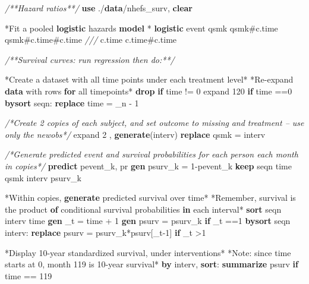 \documentclass[
  10pt,
]{book}
\newenvironment{Shaded}{\begin{snugshade}}{\end{snugshade}}
\newcommand{\BaseNTok}[1]{\textcolor[rgb]{0.00,0.00,0.81}{#1}}
\newcommand{\CommentTok}[1]{\textcolor[rgb]{0.56,0.35,0.01}{\textit{#1}}}
\newcommand{\DataTypeTok}[1]{\textcolor[rgb]{0.13,0.29,0.53}{#1}}
\newcommand{\DecValTok}[1]{\textcolor[rgb]{0.00,0.00,0.81}{#1}}
\newcommand{\FunctionTok}[1]{\textcolor[rgb]{0.00,0.00,0.00}{#1}}
\newcommand{\KeywordTok}[1]{\textcolor[rgb]{0.13,0.29,0.53}{\textbf{#1}}}
\newcommand{\NormalTok}[1]{#1}
\newcommand{\OtherTok}[1]{\textcolor[rgb]{0.56,0.35,0.01}{#1}}
\begin{document}
\begin{Shaded}
\begin{Highlighting}[]
\CommentTok{/**Hazard ratios**/}
\KeywordTok{use}\NormalTok{ ./}\KeywordTok{data}\NormalTok{/nhefs_surv, }\KeywordTok{clear}

\NormalTok{*Fit a pooled }\KeywordTok{logistic}\NormalTok{ hazards }\KeywordTok{model}\NormalTok{ *}
\KeywordTok{logistic}\NormalTok{ event qsmk qsmk#c.time qsmk#c.time#c.time }\CommentTok{///}
\NormalTok{  c.time c.time#c.time }

\CommentTok{/**Survival curves: run regression then do:**/}

\NormalTok{*Create a dataset with }\OtherTok{all}\NormalTok{ time points under each treatment }\DecValTok{level}\NormalTok{*}
\NormalTok{*Re-expand }\KeywordTok{data}\NormalTok{ with }\BaseNTok{rows} \KeywordTok{for} \OtherTok{all}\NormalTok{ timepoints*}
\KeywordTok{drop} \KeywordTok{if}\NormalTok{ time != 0}
\NormalTok{expand 120 }\KeywordTok{if}\NormalTok{ time ==0 }
\KeywordTok{bysort}\NormalTok{ seqn: }\KeywordTok{replace}\NormalTok{ time = }\DataTypeTok{_n}\NormalTok{ - 1	 }
		
\CommentTok{/*Create 2 copies of each subject, and set outcome to missing }
\CommentTok{and treatment -- use only the newobs*/}
\NormalTok{expand 2 , }\KeywordTok{generate}\NormalTok{(interv) }
\KeywordTok{replace}\NormalTok{ qsmk = interv	}

\CommentTok{/*Generate predicted event and survival probabilities }
\CommentTok{for each person each month in copies*/}
\KeywordTok{predict}\NormalTok{ pevent_k, pr}
\KeywordTok{gen}\NormalTok{ psurv_k = 1-pevent_k}
\KeywordTok{keep}\NormalTok{ seqn time qsmk interv psurv_k }

\NormalTok{*Within copies, }\KeywordTok{generate}\NormalTok{ predicted survival }\BaseNTok{over}\NormalTok{ time*}
\NormalTok{*Remember, survival is the product }\KeywordTok{of}\NormalTok{ conditional survival probabilities }\KeywordTok{in}\NormalTok{ each interval*	}
\KeywordTok{sort}\NormalTok{ seqn interv time}
\KeywordTok{gen}\NormalTok{ _t = time + 1}
\KeywordTok{gen}\NormalTok{ psurv = psurv_k }\KeywordTok{if}\NormalTok{ _t ==1 		}
\KeywordTok{bysort}\NormalTok{ seqn interv: }\KeywordTok{replace}\NormalTok{ psurv = psurv_k*psurv[_t-1] }\KeywordTok{if}\NormalTok{ _t >1 }

\NormalTok{*Display 10-}\FunctionTok{year}\NormalTok{ standardized survival, under interventions*}
\NormalTok{*Note: since time starts }\FunctionTok{at}\NormalTok{ 0, }\FunctionTok{month}\NormalTok{ 119 is 10-}\FunctionTok{year}\NormalTok{ survival*}
\KeywordTok{by}\NormalTok{ interv, }\KeywordTok{sort}\NormalTok{: }\KeywordTok{summarize}\NormalTok{ psurv }\KeywordTok{if}\NormalTok{ time == 119}


\end{Highlighting}
\end{Shaded}
\end{document}
